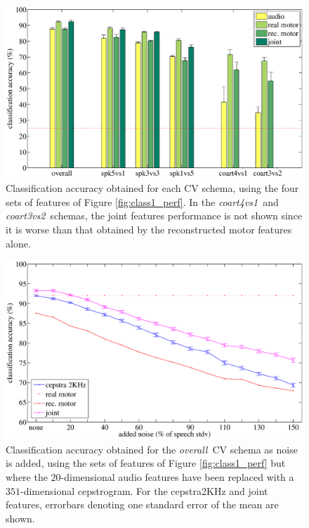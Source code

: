 \documentclass{pnastwo}
\newcommand{\overall}{\emph{overall}}
\newcommand{\coa}{\emph{coart4vs1}}
\newcommand{\cob}{\emph{coart3vs2}}
\begin{document}
\begin{figure}[t]
  \centerline{\includegraphics[width=\textwidth]{figs/figClass2}}
  \caption{Classification accuracy obtained for each CV schema, using the
    four sets of features of Figure \ref{fig:class1_perf}. In the \coa\ and
    \cob\ schemas, the joint features performance is not shown since it is
    worse than that obtained by the reconstructed motor features alone.}
  \label{fig:class2_perf}
\end{figure}

\begin{figure}[t]
  \centerline{\includegraphics[width=\textwidth]{figs/figClass3}}
  \caption{Classification accuracy obtained for the \overall\ CV schema
    as noise is added, using the sets of features of Figure \ref{fig:class1_perf}
    but where the $20$-dimensional audio features have been replaced with a
    $351$-dimensional cepstrogram. For the cepstra2KHz and joint features,
    errorbars denoting one standard error of the mean are shown.}
  \label{fig:class3_perf}
\end{figure}
\end{document}
